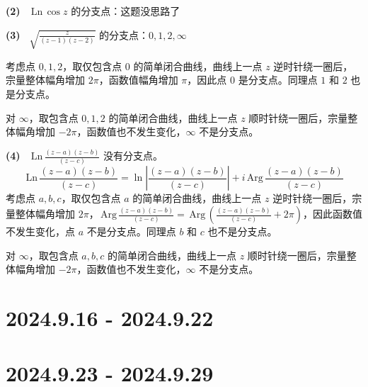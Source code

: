 \documentclass[UTF8]{report}
\def\Ln{\mathrm{\,Ln\,}}
\def\Arg{\mathrm{\,Arg\,}}
\theoremstyle{MyLineTheoremStyle} %
\theoremstyle{MyBlockTheoremStyle} %
\theoremstyle{MySubsubsectionStyle} %
\begin{document}
\textbf{(2)\ } $\Ln \cos z$ 的分支点：这题没思路了


\textbf{(3)\ } $\sqrt{\frac{z}{(z-1)(z-2)}} $ 的分支点：$0, 1, 2, \infty$

考虑点 $0,1,2$，取仅包含点 $0$ 的简单闭合曲线，曲线上一点 $z$ 逆时针绕一圈后，宗量整体幅角增加 $2\pi$，函数值幅角增加 $\pi$，因此点 $0$ 是分支点。同理点 $1$ 和 $2$ 也是分支点。

对 $\infty$，取包含点 $0,1,2$ 的简单闭合曲线，曲线上一点 $z$ 顺时针绕一圈后，宗量整体幅角增加 $-2\pi$，函数值也不发生变化，$\infty$ 不是分支点。

\textbf{(4)\ } $\Ln \frac{(z-a)(z-b)}{(z-c)}$  没有分支点。
\begin{equation}
    \Ln \frac{(z-a)(z-b)}{(z-c)} = \ln | \frac{(z-a)(z-b)}{(z-c)} | + i\Arg \frac{(z-a)(z-b)}{(z-c)}
\end{equation}
考虑点 $a,b,c$，取仅包含点 $a$ 的简单闭合曲线，曲线上一点 $z$ 逆时针绕一圈后，宗量整体幅角增加 $2\pi$，$\Arg \frac{(z-a)(z-b)}{(z-c)} = \Arg (\frac{(z-a)(z-b)}{(z-c)} + 2\pi) $，因此函数值不发生变化，点 $a$ 不是分支点。同理点 $b$ 和 $c$ 也不是分支点。

对 $\infty$，取包含点 $a,b,c$ 的简单闭合曲线，曲线上一点 $z$ 顺时针绕一圈后，宗量整体幅角增加 $-2\pi$，函数值也不发生变化，$\infty$ 不是分支点。


\chapter{2024.9.16 - 2024.9.22}\thispagestyle{fancy}

















\chapter{2024.9.23 - 2024.9.29}\thispagestyle{fancy}
\end{document}
